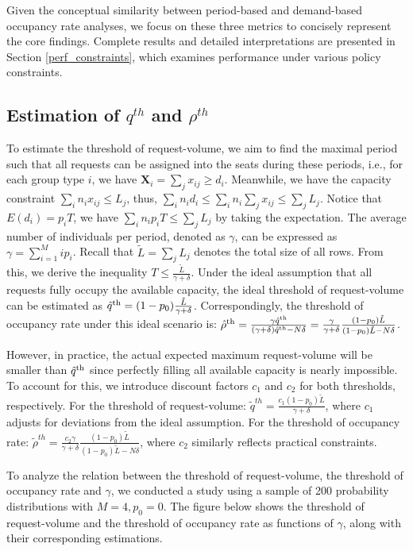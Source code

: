 Given the conceptual similarity between period-based and demand-based occupancy rate analyses, we focus on these three metrics to concisely represent the core findings. Complete results and detailed interpretations are presented in Section \ref{perf_constraints}, which examines performance under various policy constraints.


\subsection{Estimation of $q^{th}$ and $\rho^{th}$}
To estimate the threshold of request-volume, we aim to find the maximal period such that all requests can be assigned into the seats during these periods, i.e., for each group type $i$, we have $\bm{X}_{i} = \sum_{j} x_{ij} \geq d_i$. Meanwhile, we have the capacity constraint $\sum_{i} n_{i} x_{ij} \leq L_j$, thus, $\sum_{i} n_i d_i \leq \sum_{i} n_i \sum_{j} x_{ij} \leq \sum_{j} L_{j}$. Notice that $E(d_i) = p_i T$, we have $\sum_{i} n_i p_i T \leq \sum_{j} L_{j}$ by taking the expectation. The average number of individuals per period, denoted as $\gamma$, can be expressed as $\gamma = \sum_{i=1}^{M} i p_i$. Recall that $\tilde{L} = \sum_{j} L_{j}$ denotes the total size of all rows. From this, we derive the inequality $T \leq \frac{\tilde{L}}{\gamma + \delta}$. Under the ideal assumption that all requests fully occupy the available capacity, the ideal threshold of request-volume can be estimated as $\hat{q}^{\textup{th}} = (1-p_0) \frac{\tilde{L}}{\gamma + \delta}$. Correspondingly, the threshold of occupancy rate under this ideal scenario is: 
$\hat{\rho}^{\textup{th}}= \frac{\gamma \hat{q}^{\textup{th}}}{(\gamma+ \delta)\hat{q}^{\textup{th}} - N \delta} = \frac{\gamma}{\gamma +\delta} \frac{(1-p_0) \tilde{L}}{(1-p_0) \tilde{L}-N \delta}$. 


However, in practice, the actual expected maximum request-volume will be smaller than $\hat{q}^{\textup{th}}$ since perfectly filling all available capacity is nearly impossible. To account for this, we introduce discount factors $c_1$ and $c_2$ for both thresholds, respectively. For the threshold of request-volume:
$\tilde{q}^{th} =  \frac{c_1 (1-p_0) \tilde{L}}{\gamma + \delta}$, where $c_1$ adjusts for deviations from the ideal assumption.
For the threshold of occupancy rate:
$\tilde{\rho}^{th} = \frac{c_2 \gamma}{\gamma +\delta} \frac{(1-p_0) \tilde{L}}{(1-p_0) \tilde{L}-N \delta}$, where $c_2$ similarly reflects practical constraints.

To analyze the relation between the threshold of request-volume, the threshold of occupancy rate and $\gamma$, we conducted a study using a sample of 200 probability distributions with $M=4, p_0=0$. The figure below shows the threshold of request-volume and the threshold of occupancy rate as functions of $\gamma$, along with their corresponding estimations.

